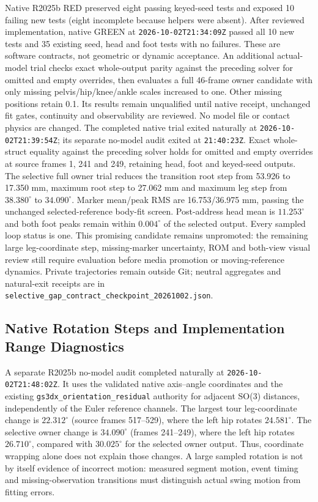 \documentclass[11pt,a4paper]{article}
\begin{document}
Native R2025b RED preserved eight passing keyed-seed tests and exposed
10 failing new tests (eight incomplete because helpers were absent).
After reviewed implementation, native GREEN at
\texttt{2026-10-02T21:34:09Z} passed all 10 new tests and 35 existing
seed, head and foot tests with no failures. These are software contracts,
not geometric or dynamic acceptance. An additional actual-model trial
checks exact whole-output parity against the preceding solver for
omitted and empty overrides, then evaluates a full 46-frame owner
candidate with only missing pelvis/hip/knee/ankle scales increased to
one. Other missing positions retain 0.1. Its results remain unqualified
until native receipt, unchanged fit gates, continuity and observability
are reviewed. No model file or contact physics are changed.
The completed native trial exited naturally at
\texttt{2026-10-02T21:39:54Z}; its separate no-model audit exited at
\texttt{21:40:23Z}. Exact whole-struct equality against the preceding
solver holds for omitted and empty overrides at source frames 1, 241
and 249, retaining head, foot and keyed-seed outputs. The selective
full owner trial reduces the transition root step from 53.926 to
17.350 mm, maximum root step to 27.062 mm and maximum leg step from
$38.380^\circ$ to $34.090^\circ$. Marker mean/peak RMS are
16.753/36.975 mm, passing the unchanged selected-reference body-fit
screen. Post-address head mean is $11.253^\circ$ and both foot peaks
remain within $0.004^\circ$ of the selected output. Every sampled loop
status is one. This promising candidate remains unpromoted: the
remaining large leg-coordinate step, missing-marker uncertainty,
ROM and both-view visual review still require evaluation before
media promotion or moving-reference dynamics. Private trajectories
remain outside Git; neutral aggregates and natural-exit receipts are
in \texttt{selective\_gap\_contract\_checkpoint\_20261002.json}.

\subsection{Native Rotation Steps and Implementation Range Diagnostics}
A separate R2025b no-model audit completed naturally at
\texttt{2026-10-02T21:48:02Z}. It uses the validated native axis--angle
coordinates and the existing \texttt{gs3dx\_orientation\_residual}
authority for adjacent SO(3) distances, independently of the Euler
reference channels. The largest tour leg-coordinate change is
$22.312^\circ$ (source frames 517--529), where the left hip rotates
$24.581^\circ$. The selective owner change is $34.090^\circ$
(frames 241--249), where the left hip rotates $26.710^\circ$,
compared with $30.025^\circ$ for the selected owner output. Thus,
coordinate wrapping alone does not explain those changes. A large
sampled rotation is not by itself evidence of incorrect motion:
measured segment motion, event timing and missing-observation
transitions must distinguish actual swing motion from fitting errors.
\end{document}

